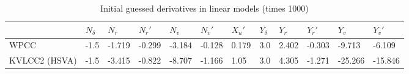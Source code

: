 \begin{table}[h]
    \scriptsize
    \caption{Initial guessed derivatives in linear models (times 1000)}
    \label{tab:initial}
    \begin{tabular}{|T|T|T|T|T|T|T|T|T|T|T|T|}
\hline
 & 

\( N_{\delta} \)
& 

\( N_{r} \)
& 

\( N_{\dot{r}}' \)
& 

\( N_{v} \)
& 

\( N_{\dot{v}}' \)
& 

\( X_{\dot{u}}' \)
& 

\( Y_{\delta} \)
& 

\( Y_{r} \)
& 

\( Y_{\dot{r}}' \)
& 

\( Y_{v} \)
& 

\( Y_{\dot{v}}' \)
\\
\hline

WPCC
&

-1.5
&

-1.719
&

-0.299
&

-3.184
&

-0.128
&

0.179
&

3.0
&

2.402
&

-0.303
&

-9.713
&

-6.109
\\

KVLCC2 (HSVA)
&

-1.5
&

-3.415
&

-0.822
&

-8.707
&

-1.166
&

1.05
&

3.0
&

4.305
&

-1.271
&

-25.266
&

-15.846
\\
\hline
\end{tabular}

\end{table}

